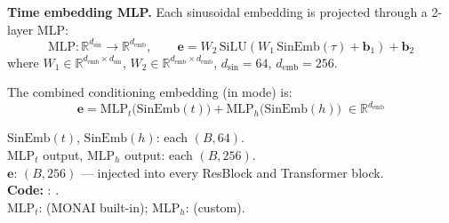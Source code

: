 \textbf{Time embedding MLP.}  Each sinusoidal embedding is projected through a
2-layer MLP:
\begin{equation}
  \mathrm{MLP}: \mathbb{R}^{d_\mathrm{sin}} \to \mathbb{R}^{d_\mathrm{emb}},
  \qquad
  \mathbf{e} = W_2\,\mathrm{SiLU}(W_1\,\mathrm{SinEmb}(\tau) + \mathbf{b}_1) + \mathbf{b}_2
  \label{eq:time_mlp}
\end{equation}
where $W_1 \in \mathbb{R}^{d_\mathrm{emb} \times d_\mathrm{sin}}$,
$W_2 \in \mathbb{R}^{d_\mathrm{emb} \times d_\mathrm{emb}}$,
$d_\mathrm{sin} = 64$, $d_\mathrm{emb} = 256$.

The combined conditioning embedding (in  mode) is:
\begin{equation}
  \mathbf{e} = \mathrm{MLP}_t\!\bigl(\mathrm{SinEmb}(t)\bigr)
             + \mathrm{MLP}_h\!\bigl(\mathrm{SinEmb}(h)\bigr)
    \;\in \mathbb{R}^{d_\mathrm{emb}}
  \label{eq:conditioning}
\end{equation}
\begin{shapes}
$\mathrm{SinEmb}(t)$, $\mathrm{SinEmb}(h)$: each $(B, 64)$.\\
$\mathrm{MLP}_t$ output, $\mathrm{MLP}_h$ output: each $(B, 256)$.\\
$\mathbf{e}$: $(B, 256)$ --- injected into every ResBlock and Transformer block.\\
\textbf{Code:} :
.\\
$\mathrm{MLP}_t$:  (MONAI built-in);
$\mathrm{MLP}_h$:  (custom).
\end{shapes}

